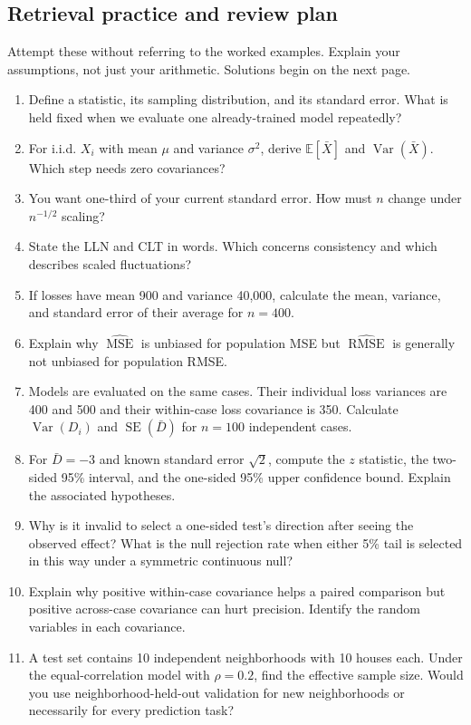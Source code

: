 \documentclass[11pt,letterpaper]{article}
\newcommand{\E}{\mathbb E}
\newcommand{\Var}{\operatorname{Var}}
\newcommand{\SE}{\operatorname{SE}}
\newcommand{\MSE}{\operatorname{MSE}}
\newcommand{\RMSE}{\operatorname{RMSE}}
\theoremstyle{definition}
\theoremstyle{remark}
\numberwithin{equation}{section}
\begin{document}
\subsection{Retrieval practice and review plan}
Attempt these without referring to the worked examples. Explain your assumptions,
not just your arithmetic. Solutions begin on the next page.
\begin{enumerate}[label=\textbf{\arabic*.}]
\item Define a statistic, its sampling distribution, and its standard error.
What is held fixed when we evaluate one already-trained model repeatedly?
\item For i.i.d. $X_i$ with mean $\mu$ and variance $\sigma^2$, derive
$\E[\bar X]$ and $\Var(\bar X)$. Which step needs zero covariances?
\item You want one-third of your current standard error. How must $n$ change
under $n^{-1/2}$ scaling?
\item State the LLN and CLT in words. Which concerns consistency and which
describes scaled fluctuations?
\item If losses have mean 900 and variance 40,000, calculate the mean,
variance, and standard error of their average for $n=400$.
\item Explain why $\widehat{\MSE}$ is unbiased for population MSE but
$\widehat{\RMSE}$ is generally not unbiased for population RMSE.
\item Models are evaluated on the same cases. Their individual loss variances
are 400 and 500 and their within-case loss covariance is 350. Calculate
$\Var(D_i)$ and $\SE(\bar D)$ for $n=100$ independent cases.
\item For $\bar D=-3$ and known standard error $\sqrt2$, compute the $z$ statistic,
the two-sided 95\% interval, and the one-sided 95\% upper confidence bound.
Explain the associated hypotheses.
\item Why is it invalid to select a one-sided test's direction after seeing
the observed effect? What is the null rejection rate when either 5\% tail
is selected in this way under a symmetric continuous null?
\item Explain why positive within-case covariance helps a paired comparison
but positive across-case covariance can hurt precision. Identify the random
variables in each covariance.
\item A test set contains 10 independent neighborhoods with 10 houses each.
Under the equal-correlation model with $\rho=0.2$, find the effective sample
size. Would you use neighborhood-held-out validation for new neighborhoods
or necessarily for every prediction task?
\end{enumerate}
\end{document}
